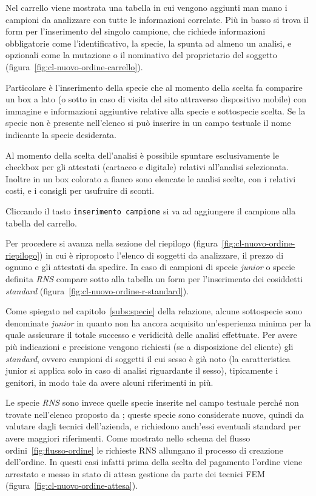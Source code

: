 Nel \textsf{carrello} viene mostrata una tabella in cui vengono aggiunti man mano i campioni da analizzare con tutte le informazioni correlate. Più in basso si trova il form per l'inserimento del singolo campione, che richiede informazioni obbligatorie come l'identificativo, la specie, la spunta ad almeno un analisi, e opzionali come la mutazione o il nominativo del proprietario del soggetto (figura~\ref{fig:cl-nuovo-ordine-carrello}).

Particolare è l'inserimento della specie che al momento della scelta fa comparire un box a lato (o sotto in caso di visita del sito attraverso dispositivo mobile) con immagine e informazioni aggiuntive relative alla specie e sottospecie scelta. Se la specie non è presente nell'elenco si può inserire in un campo testuale il nome indicante la specie desiderata.

Al momento della scelta dell'analisi è possibile spuntare esclusivamente le checkbox per gli attestati (cartaceo e digitale) relativi all'analisi selezionata. Inoltre in un box colorato a fianco sono elencate le analisi scelte, con i relativi costi, e i consigli per usufruire di sconti.

Cliccando il tasto \texttt{inserimento campione} si va ad aggiungere il campione alla tabella del carrello.

Per procedere si avanza nella sezione del \textsf{riepilogo} (figura~\ref{fig:cl-nuovo-ordine-riepilogo}) in cui è riproposto l'elenco di soggetti da analizzare, il prezzo di ognuno e gli attestati da spedire. In caso di campioni di specie \emph{junior} o specie definita \emph{RNS} compare sotto alla tabella un form per l'inserimento dei cosiddetti \emph{standard} (figura~\ref{fig:cl-nuovo-ordine-r-standard}).

Come spiegato nel capitolo~\ref{subs:specie} della relazione, alcune sottospecie sono denominate \emph{junior} in quanto {\fem} non ha ancora acquisito un'esperienza minima per la quale assicurare il totale successo e veridicità delle analisi effettuate. Per avere più indicazioni e precisione vengono richiesti (se a disposizione del cliente) gli \emph{standard}, ovvero campioni di soggetti il cui sesso è già noto (la caratteristica junior si applica solo in caso di analisi riguardante il sesso), tipicamente i genitori, in modo tale da avere alcuni riferimenti in più.

Le specie \emph{RNS} sono invece quelle specie inserite nel campo testuale perché non trovate nell'elenco proposto da {\fem}; queste specie sono considerate nuove, quindi da valutare dagli tecnici dell'azienda, e richiedono anch'essi eventuali standard per avere maggiori riferimenti. Come mostrato nello schema del flusso ordini~\ref{fig:flusso-ordine} le richieste RNS allungano il processo di creazione dell'ordine. In questi casi infatti prima della scelta del pagamento l'ordine viene arrestato e messo in stato di \textsf{attesa gestione da parte dei tecnici FEM} (figura~\ref{fig:cl-nuovo-ordine-attesa}).

